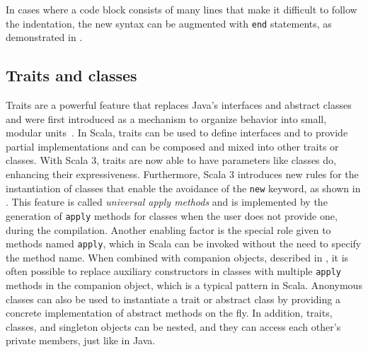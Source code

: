


In cases where a code block consists of many lines that make it difficult to follow the indentation, the new syntax can be augmented with \texttt{end} statements, as demonstrated in .




\subsection{Traits and classes}

Traits are a powerful feature that replaces Java's interfaces and abstract classes and were first introduced as a mechanism to organize behavior into small, modular units~\cite{traits}.
%
In Scala, traits can be used to define interfaces and to provide partial implementations and can be composed and mixed into other traits or classes.
%
With Scala 3, traits are now able to have parameters like classes do, enhancing their expressiveness.
%
Furthermore, Scala 3 introduces new rules for the instantiation of classes that enable the avoidance of the \texttt{new} keyword, as shown in .
%
This feature is called \textit{universal apply methods} and is implemented by the generation of \texttt{apply} methods for classes when the user does not provide one, during the compilation.
%
Another enabling factor is the special role given to methods named \texttt{apply}, which in Scala can be invoked without the need to specify the method name.
%
When combined with companion objects, described in , it is often possible to replace auxiliary constructors in classes with multiple \texttt{apply} methods in the companion object, which is a typical pattern in Scala.
%
Anonymous classes can also be used to instantiate a trait or abstract class by providing a concrete implementation of abstract methods on the fly.
%
In addition, traits, classes, and singleton objects can be nested, and they can access each other's private members, just like in Java.

